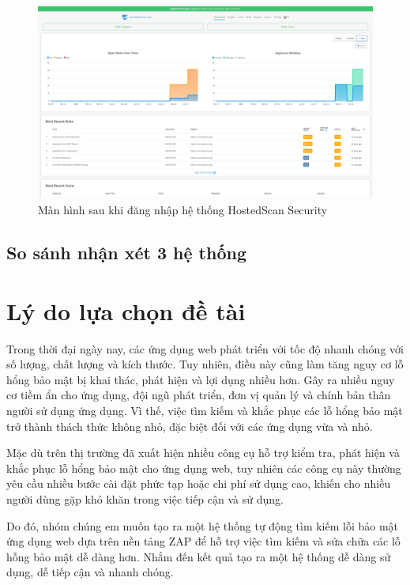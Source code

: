 \begin{figure}[H]
    \centering
    \includegraphics[width=\textwidth]{applied-thesis-chapters/chapter-1/hostedscan.com_dashboard.png}
    \caption{Màn hình sau khi đăng nhập hệ thống HostedScan Security}
\end{figure}

\subsection{So sánh nhận xét 3 hệ thống}

\section{Lý do lựa chọn đề tài}

\tab Trong thời đại ngày nay, các ứng dụng web phát triển với tốc độ nhanh chóng với số lượng, chất lượng và kích thước.
Tuy nhiên, điều này cũng làm tăng nguy cơ lỗ hổng bảo mật bị khai thác, phát hiện và lợi dụng nhiều hơn.
Gây ra nhiều nguy cơ tiềm ẩn cho ứng dụng, đội ngũ phát triển, đơn vị quản lý và chính bản thân người sử dụng ứng dụng.
Vì thế, việc tìm kiếm và khắc phục các lỗ hổng bảo mật trở thành thách thức không nhỏ, đặc biệt đối với các ứng dụng vừa và nhỏ.
\par

Mặc dù trên thị trường đã xuất hiện nhiều công cụ hỗ trợ kiểm tra, phát hiện và khắc phục lỗ hổng bảo mật cho ứng
dụng web, tuy nhiên các công cụ này thường yêu cầu nhiều bước cài đặt phức tạp hoặc chi phí sử dụng cao, khiến cho nhiều người dùng gặp khó khăn trong việc tiếp cận và sử dụng.
\par

Do đó, nhóm chúng em muốn tạo ra một hệ thống tự động tìm kiếm lỗi bảo mật ứng dụng web dựa trên nền tảng ZAP để hỗ trợ việc tìm kiếm và sửa chữa các lỗ hỗng bảo mật dễ dàng hơn.
Nhắm đến kết quả tạo ra một hệ thống dễ dàng sử dụng, dễ tiếp cận và nhanh chóng.

